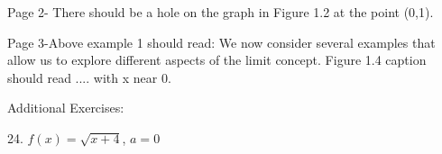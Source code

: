 Page 2- There should be a hole on the graph in Figure 1.2 at the point (0,1).

Page 3-Above example 1 should read: We now consider several examples that allow us to explore different aspects of the limit concept.
	 Figure 1.4 caption should read .... with x near 0. 


Additional Exercises:

24.  $f(x)=\sqrt{x+4}$, $a=0$